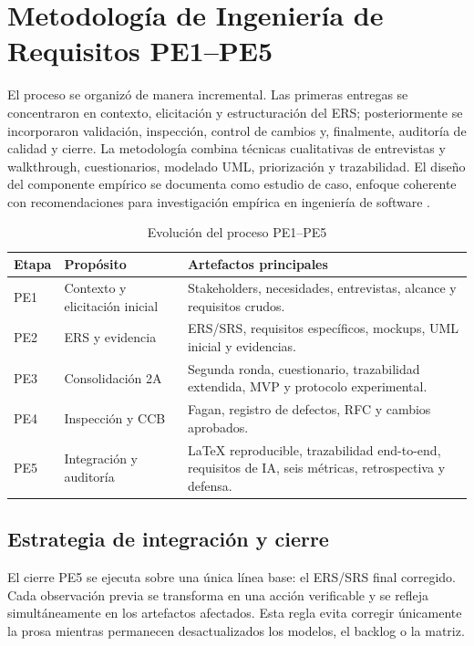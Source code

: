 \documentclass[12pt,a4paper]{article}
\begin{document}
\section{Metodología de Ingeniería de Requisitos PE1–PE5}
El proceso se organizó de manera incremental. Las primeras entregas se concentraron en contexto, elicitación y estructuración del ERS; posteriormente se incorporaron validación, inspección, control de cambios y, finalmente, auditoría de calidad y cierre. La metodología combina técnicas cualitativas de entrevistas y walkthrough, cuestionarios, modelado UML, priorización y trazabilidad. El diseño del componente empírico se documenta como estudio de caso, enfoque coherente con recomendaciones para investigación empírica en ingeniería de software \cite{runeson2009,wohlin2012}.

\begin{table}[H]\centering\caption{Evolución del proceso PE1–PE5}\begin{tabularx}{\textwidth}{p{}X X}\toprule
\textbf{Etapa}&\textbf{Propósito}&\textbf{Artefactos principales}\\\midrule
PE1&Contexto y elicitación inicial&Stakeholders, necesidades, entrevistas, alcance y requisitos crudos.\\
PE2&ERS y evidencia&ERS/SRS, requisitos específicos, mockups, UML inicial y evidencias.\\
PE3&Consolidación 2A&Segunda ronda, cuestionario, trazabilidad extendida, MVP y protocolo experimental.\\
PE4&Inspección y CCB&Fagan, registro de defectos, RFC y cambios aprobados.\\
PE5&Integración y auditoría&LaTeX reproducible, trazabilidad end-to-end, requisitos de IA, seis métricas, retrospectiva y defensa.\\\bottomrule
\end{tabularx}\end{table}

\subsection{Estrategia de integración y cierre}
El cierre PE5 se ejecuta sobre una única línea base: el ERS/SRS final corregido. Cada observación previa se transforma en una acción verificable y se refleja simultáneamente en los artefactos afectados. Esta regla evita corregir únicamente la prosa mientras permanecen desactualizados los modelos, el backlog o la matriz.
\end{document}
